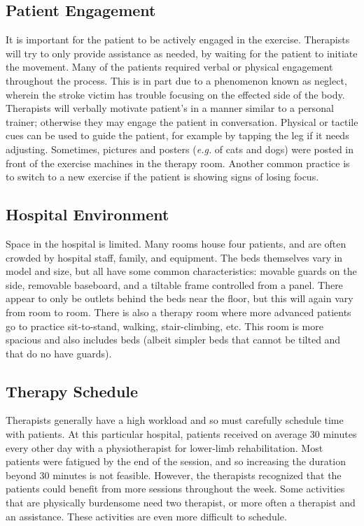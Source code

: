 \documentclass[12pt]{report}
\begin{document}
	\subsection{Patient Engagement} 
	 It is important for the patient to be actively engaged in the exercise. Therapists will try to only provide assistance as needed, by waiting for the patient to initiate the movement. Many of the patients required verbal or physical engagement throughout the process. This is in part due to a phenomenon known as neglect, wherein the stroke victim has trouble focusing on the effected side of the body. Therapists will verbally motivate patient's in a manner similar to a personal trainer; otherwise they may engage the patient in conversation. Physical or tactile cues can be used to guide the patient, for example by tapping the leg if it needs adjusting. Sometimes, pictures and posters (\textit{e.g.} of cats and dogs) were posted in front of the exercise machines in the therapy room. Another common practice is to switch to a new exercise if the patient is showing signs of losing focus. 
	 
	 \subsection{Hospital Environment}
	Space in the hospital is limited. Many rooms house four patients, and are often crowded by hospital staff, family, and equipment. The beds themselves vary in model and size, but all have some common characteristics: movable guards on the side, removable baseboard, and a tiltable frame controlled from a panel. There appear to only be outlets behind the beds near the floor, but this will again vary from room to room. 
	There is also a therapy room where more advanced patients go to practice sit-to-stand, walking, stair-climbing, etc. This room is more spacious and also includes beds (albeit simpler beds that cannot be tilted and that do no have guards). 
	
	\subsection{Therapy Schedule}
	
	Therapists generally have a high workload and so must carefully schedule time with patients. At this particular hospital, patients received on average 30 minutes every other day with a physiotherapist for lower-limb rehabilitation. Most patients were fatigued by the end of the session, and so increasing the duration beyond 30 minutes is not feasible. However, the therapists recognized that the patients could benefit from more sessions throughout the week. Some activities that are physically burdensome need two therapist, or more often a therapist and an assistance. These activities are even more difficult to schedule.
	
\end{document}
